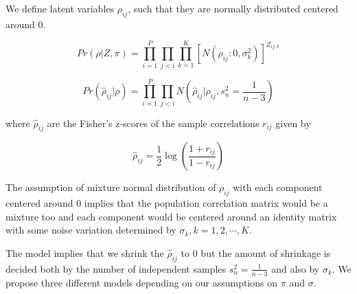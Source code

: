 We define  latent variables $\rho_{ij}$, such that they are normally distributed centered around $0$.

\begin{equation}
Pr \left ( \rho |  Z, \pi  \right )  = \prod_{i=1}^{P} \prod_{j < i} \prod_{k=1}^{K} \left [ N \left (\rho_{ij} : 0, \sigma^2_{k} \right ) \right ]^{Z_{ij:k}}  
\end{equation}

\begin{equation}
Pr \left (\hat{\rho}_{ij} | \rho \right ) = \prod_{i=1}^{P} \prod_{j < i } N \left (\hat{\rho}_{ij} | \rho_{ij}, s^2_n = \frac{1}{n-3} \right)  
\end{equation}

where $\hat{\rho}_{ij}$ are the Fisher's z-scores of the sample correlations $r_{ij}$ given by 

\begin{equation}
\hat{\rho}_{ij} = \frac{1}{2} \log \left ( \frac{1+r_{ij}}{1- r_{ij}} \right ) 
\end{equation}

The assumption of mixture normal distribution of $\rho_{ij}$ with each component centered around $0$ implies that the population correlation matrix would be a mixture too and each component would be centered around an identity matrix with some noise variation determined by $\sigma_k, k=1,2,\cdots,K$.

The model implies that we shrink the $ \hat{\rho}_{ij}$ to $0$ but the amount of shrinkage is decided both by the number of independent samples $s^2_{n} = \frac{1}{n-3}$ and also by $\sigma_{k}$. We propose three different models depending on our assumptions on $\pi$ and $\sigma$. 

